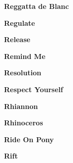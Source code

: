 \vspace{10pt} 
\begin{center}\textbf{Reggatta de Blanc}\end{center}
\newline
\vspace{10pt} 
\begin{center}\textbf{Regulate}\end{center}
\newline
\vspace{10pt} 
\begin{center}\textbf{Release}\end{center}
\newline
\vspace{10pt} 
\begin{center}\textbf{Remind Me}\end{center}
\newline
\vspace{10pt} 
\begin{center}\textbf{Resolution}\end{center}
\newline
\vspace{10pt} 
\begin{center}\textbf{Respect Yourself}\end{center}
\newline
\vspace{10pt} 
\begin{center}\textbf{Rhiannon}\end{center}
\newline
\vspace{10pt} 
\begin{center}\textbf{Rhinoceros}\end{center}
\newline
\vspace{10pt} 
\begin{center}\textbf{Ride On Pony}\end{center}
\newline
\vspace{10pt} 
\begin{center}\textbf{Rift}\end{center}
\newline
